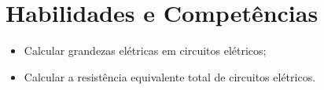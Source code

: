 \section{Habilidades e Competências}
\begin{itemize}
\item Calcular grandezas elétricas em circuitos elétricos;
\item Calcular a resistência equivalente total de circuitos elétricos.
\end{itemize}
